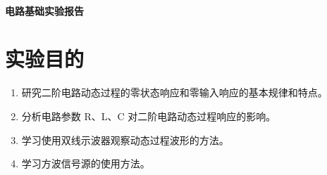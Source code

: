 \documentclass[a4paper,utf8]{article}
\begin{document}
\begin{center}
    {\mbox{}\\[7em]\bfseries\songti%
    电路基础实验报告}\\[34mm]
\end{center}
\newpage

\section{实验目的}
\begin{enumerate}
    \item 研究二阶电路动态过程的零状态响应和零输入响应的基本规律和特点。
    \item 分析电路参数 R、L、C 对二阶电路动态过程响应的影响。
    \item 学习使用双线示波器观察动态过程波形的方法。
    \item 学习方波信号源的使用方法。
\end{enumerate}
\end{document}
